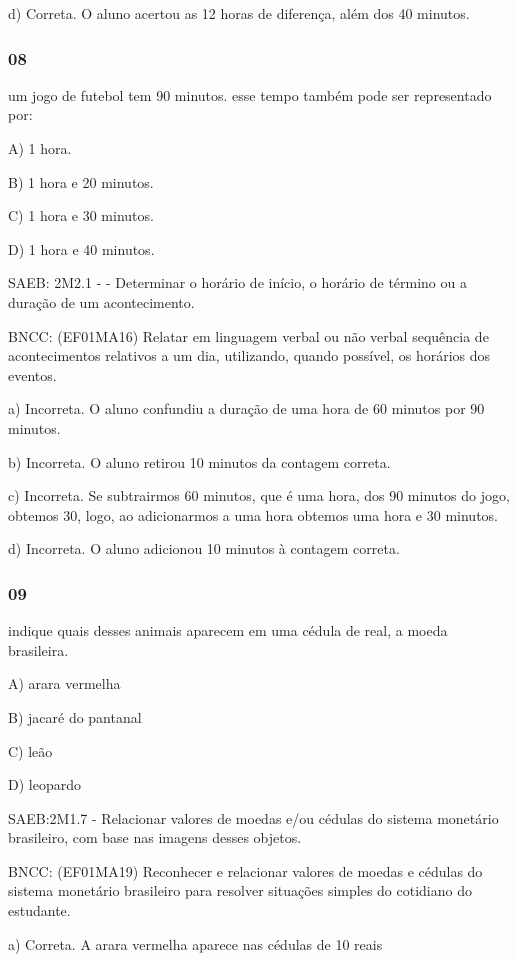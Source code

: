 \begin{itemize}
\begin{itemize}
d) Correta. O aluno acertou as 12 horas de diferença, além dos 40
minutos.

\subsubsection{08}\label{section-139}

um jogo de futebol tem 90 minutos. esse tempo também pode ser
representado por:

A) 1 hora.

B) 1 hora e 20 minutos.

C) 1 hora e 30 minutos.

D) 1 hora e 40 minutos.

SAEB: 2M2.1 - - Determinar o horário de início, o horário de término ou
a duração de um acontecimento.

BNCC: (EF01MA16) Relatar em linguagem verbal ou não verbal sequência de
acontecimentos relativos a um dia, utilizando, quando possível, os
horários dos eventos.

a) Incorreta. O aluno confundiu a duração de uma hora de 60 minutos por
90 minutos.

b) Incorreta. O aluno retirou 10 minutos da contagem correta.

c) Incorreta. Se subtrairmos 60 minutos, que é uma hora, dos 90 minutos
do jogo, obtemos 30, logo, ao adicionarmos a uma hora obtemos uma hora e
30 minutos.

d) Incorreta. O aluno adicionou 10 minutos à contagem correta.

\subsubsection{09}\label{section-140}

indique quais desses animais aparecem em uma cédula de real, a moeda
brasileira.

A) arara vermelha

B) jacaré do pantanal

C) leão

D) leopardo

SAEB:2M1.7 - Relacionar valores de moedas e/ou cédulas do sistema
monetário brasileiro, com base nas imagens desses objetos.

BNCC: (EF01MA19) Reconhecer e relacionar valores de moedas e cédulas do
sistema monetário brasileiro para resolver situações simples do
cotidiano do estudante.

a) Correta. A arara vermelha aparece nas cédulas de 10 reais


\end{itemize}
\end{itemize}
